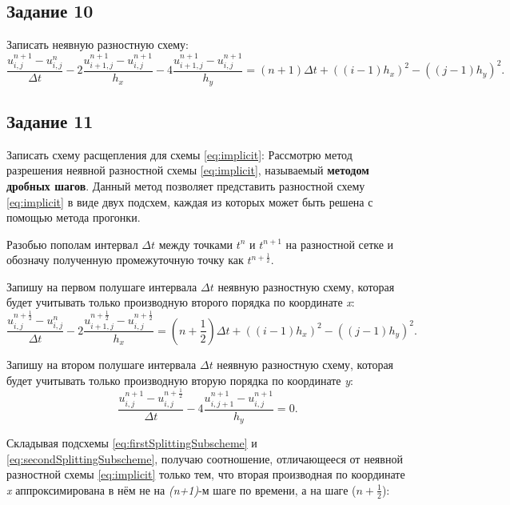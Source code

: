 \documentclass[12pt, a4paper]{report}
\begin{document}
	\subsection*{Задание 10}
	\large
	Записать неявную разностную схему:
	\begin{equation}\label{eq:implicit}
		\frac{u_{i, j}^{n+1} - u_{i, j}^{n}}{\Delta t} - 2\frac{u_{i+1, j}^{n+1} - u_{i, j}^{n+1}}{h_{x}} - 4\frac{u_{i+1, j}^{n+1} - u_{i, j}^{n+1}}{h_{y}} = (n+1)\Delta t + ((i-1)h_{x})^{2} - ((j-1)h_{y})^{2}.
	\end{equation}

	\subsection*{Задание 11}
	\large
	Записать схему расщепления для схемы \eqref{eq:implicit}:
	Рассмотрю метод разрешения неявной разностной схемы \eqref{eq:implicit}, называемый \textbf{методом дробных шагов}. Данный метод позволяет представить разностной схему \eqref{eq:implicit} в виде двух подсхем, каждая из которых может быть решена с помощью метода прогонки. \par
	Разобью пополам интервал $\Delta t$ между точками $t^{n}$ и $t^{n+1}$ на разностной сетке и обозначу полученную промежуточную точку как $t^{n+\frac{1}{2}}$. \par
	Запишу на первом полушаге интервала $\Delta t$ неявную разностную схему, которая будет учитывать только производную второго порядка по координате \textit{x}:
	\begin{equation}\label{eq:firstSplittingSubscheme}
		\frac{u_{i, j}^{n+\frac{1}{2}} - u_{i, j}^{n}}{\Delta t} - 2\frac{u_{i+1, j}^{n+\frac{1}{2}} - u_{i, j}^{n+\frac{1}{2}}}{h_{x}} = (n + \frac{1}{2})\Delta t + ((i-1)h_{x})^{2} - ((j-1)h_{y})^{2}.
	\end{equation}
	\par
	Запишу на втором полушаге интервала $\Delta t$ неявную разностную схему, которая будет учитывать только производную вторую порядка по координате \textit{y}:
	\begin{equation}\label{eq:secondSplittingSubscheme}
		\frac{u_{i, j}^{n+1} - u_{i, j}^{n+\frac{1}{2}}}{\Delta t} - 4\frac{u_{i, j+1}^{n+1} - u_{i, j}^{n+1}}{h_{y}} = 0.
	\end{equation}
	\par
	Складывая подсхемы \eqref{eq:firstSplittingSubscheme} и \eqref{eq:secondSplittingSubscheme}, получаю соотношение, отличающееся от неявной разностной схемы \eqref{eq:implicit} только тем, что вторая производная по координате \textit{x} аппроксимирована в нём не на \textit{(n+1)}-м шаге по времени, а на шаге ($n+\frac{1}{2}$):
\end{document}
